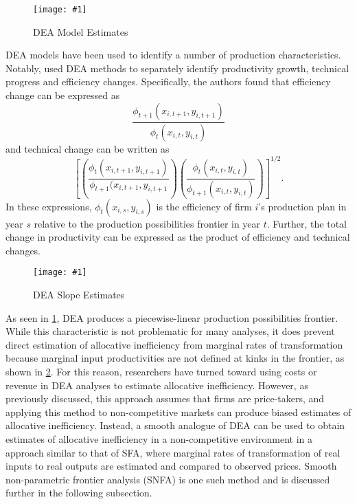 \documentclass[twocolumn]{article}
\newcommand{\img}[1]{\texttt{[image: \#1]}}
\begin{document}
\begin{figure}
	\img{R/dea-plot.pdf}
	\caption{DEA Model Estimates}
	\label{fig:DEA-plot}
\end{figure}

DEA models have been used to identify a number of production characteristics. Notably, \cite{Fare} used DEA methods to separately identify productivity growth, technical progress and efficiency changes. Specifically, the authors found that efficiency change can be expressed as
\begin{equation}
\frac{\phi_{t+1}(x_{i,t+1}, y_{i,t+1})}{\phi_{t}(x_{i,t}, y_{i,t})}
\end{equation}
and technical change can be written as
\begin{equation}
\left[\left(\frac{\phi_t(x_{i,t+1}, y_{i,t+1})}{\phi_{t+1}(x_{i,t+1}, y_{i,t+1}}\right)\left(\frac{\phi_t(x_{i,t}, y_{i,t})}{\phi_{t+1}(x_{i,t}, y_{i,t})}\right)\right]^{1/2}.
\end{equation}
In these expressions, $\phi_t(x_{i,s}, y_{i,s})$ is the efficiency of firm $i$'s production plan in year $s$ relative to the production possibilities frontier in year $t$. Further, the total change in productivity can be expressed as the product of efficiency and technical changes.

\begin{figure}
	\img{R/dea-grad-plot.pdf}
	\caption{DEA Slope Estimates}
	\label{fig:DEA-grad-plot}
\end{figure}

As seen in \cref{fig:DEA-plot}, DEA produces a piecewise-linear production possibilities frontier. While this characteristic is not problematic for many analyses, it does prevent direct estimation of allocative inefficiency from marginal rates of transformation because marginal input productivities are not defined at kinks in the frontier, as shown in \cref{fig:DEA-grad-plot}. For this reason, researchers have turned toward using costs or revenue in DEA analyses to estimate allocative inefficiency. However, as previously discussed, this approach assumes that firms are price-takers, and applying this method to non-competitive markets can produce biased estimates of allocative inefficiency. Instead, a smooth analogue of DEA can be used to obtain estimates of allocative inefficiency in a non-competitive environment in a approach similar to that of SFA, where marginal rates of transformation of real inputs to real outputs are estimated and compared to observed prices. Smooth non-parametric frontier analysis (SNFA) is one such method and is discussed further in the following subsection.
\end{document}
